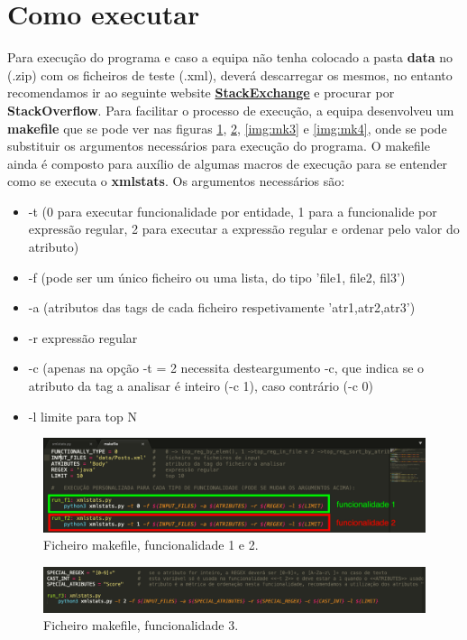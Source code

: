\documentclass[11pt,a4paper]{report}%
\begin{document}
\section{Como executar}
Para execução do programa e caso a equipa não tenha colocado a pasta \textbf{data} no (.zip) com os ficheiros de teste (.xml), deverá descarregar os mesmos, no entanto recomendamos ir ao seguinte website \textbf{\href{https://archive.org/download/stackexchange}{StackExchange}} e procurar por \textbf{StackOverflow}. Para facilitar o processo de execução, a equipa desenvolveu um \textbf{makefile} que se pode ver nas figuras \ref{img:mk1}, \ref{img:mk2}, \ref{img:mk3} e \ref{img:mk4}, onde se pode substituir os argumentos necessários para execução do programa. O makefile ainda é composto para auxílio de algumas macros de execução para se entender como se executa o \textbf{xmlstats}. Os argumentos necessários são:
\begin{itemize}
    \item -t (0 para executar funcionalidade por entidade, 1 para a funcionalide por expressão regular, 2 para executar a expressão regular e ordenar pelo valor do atributo)
    \item -f (pode ser um único ficheiro ou uma lista, do tipo 'file1, file2, fil3')
    \item -a  (atributos das tags de cada ficheiro respetivamente 'atr1,atr2,atr3')
    \item -r expressão regular
    \item -c (apenas na opção -t = 2 necessita desteargumento -c, que indica se o atributo da tag a analisar é inteiro (-c 1), caso contrário (-c 0)
    \item -l limite para top N
\end{itemize}{}
\begin{figure}[h]
	\centering
	\includegraphics[scale=0.40]{mk1.png}
	\caption{Ficheiro makefile, funcionalidade 1 e 2.}
	\label{img:mk1}
\end{figure}

\begin{figure}[h]
	\centering
	\includegraphics[scale=0.40]{mk2.png}
	\caption{Ficheiro makefile, funcionalidade 3.}
	\label{img:mk2}
\end{figure}
\end{document}
